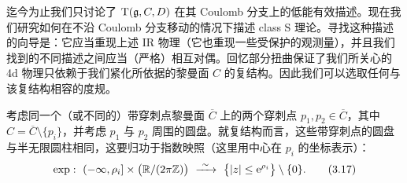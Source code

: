 迄今为止我们只讨论了 $\mathrm{T}(\mathfrak{g},C,D)$ 在其 Coulomb 分支上的低能有效描述。现在我们研究如何在不沿 Coulomb 分支移动的情况下描述 class S 理论。寻找这种描述的向导是：它应当重现上述 IR 物理（它也重现一些受保护的观测量），并且我们找到的不同描述之间应当（严格）相互对偶。回忆部分扭曲保证了我们所关心的 4d 物理只依赖于我们紧化所依据的黎曼面 $C$ 的复结构。因此我们可以选取任何与该复结构相容的度规。

 考虑同一个（或不同的）带穿刺点黎曼面 $\overline C$ 上的两个穿刺点 $p_1,p_2\in\overline C$，其中 $C=\overline C\setminus\{p_i\}$，并考虑 $p_1$ 与 $p_2$ 周围的圆盘。就复结构而言，这些带穿刺点的圆盘与半无限圆柱相同，这要归功于指数映照（这里用中心在 $p_i$ 的坐标表示）：
\begin{equation}
  \exp:\ (-\infty,\rho_i]\times\big(\R/(2\pi\Z)\big)
  \ \xrightarrow{\ \sim\ }\ 
  \big\{|z|\le \ee^{\rho_i}\big\}\setminus\{0\}.
  \tag{3.17}
\end{equation}
\begin{center}
\end{center}


